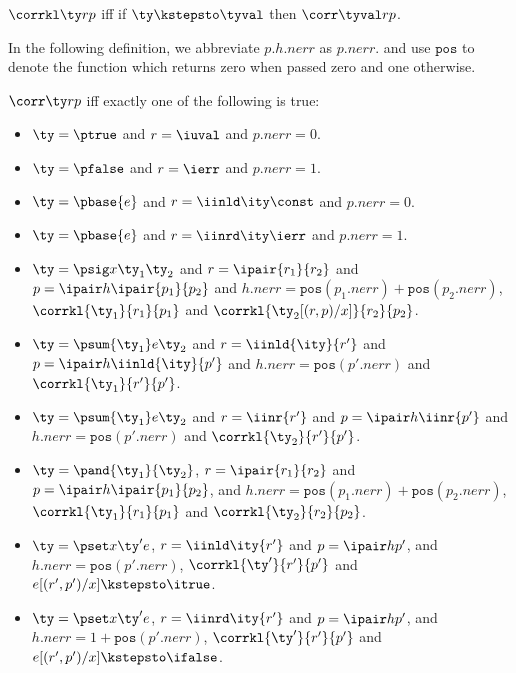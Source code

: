 \begin{definition}
$\corrkl \ty r p$ iff if $\ty \kstepsto \tyval$ then $\corr \tyval r p$.
\end{definition}

In the following definition, we abbreviate $p.h.{nerr}$ as $p.{nerr}$.
and use $\mathtt{pos}$ to denote the function which returns zero when
passed zero and one otherwise.


\begin{definition}
$\corr \ty r p$ iff exactly one of the following is true:
  \begin{itemize}
  \item $\ty = \ptrue$ and $r = \iuval$ and $p.{nerr} = 0$.
  \item $\ty = \pfalse$ and $r = \ierr$ and $p.{nerr} = 1$.
  \item $\ty = \pbase{e}$ and $r = \iinld \ity \const$ and $p.{nerr} = 0$.
  \item $\ty = \pbase{e}$ and $r = \iinrd \ity \ierr$ and $p.{nerr} = 1$.
  \item $\ty = \psig x {\ty_1} {\ty_2}$ and $r =\ipair {r_1} {r_2}$ and $p =
    \ipair h {\ipair {p_1} {p_2}}$ 
    and $h.{nerr} = \mathtt{pos}(p_1.{nerr}) + \mathtt{pos}(p_2.{nerr})$, $\corrkl
    {\ty_1} {r_1} {p_1}$ and $\corrkl {\ty_2[(r,p)/x]} {r_2} {p_2}$.
  \item $\ty = \psum {\ty_1} e {\ty_2}$ and $r =\iinld {\ity}{r'}$
    and $p = \ipair h {\iinld {\ity}{p'}}$
    and $h.{nerr} = \mathtt{pos}(p'.{nerr})$ and $\corrkl
    {\ty_1} {r'} {p'}$.
  \item $\ty = \psum {\ty_1} e {\ty_2}$ and $r =\iinr {r'}$
    and $p = \ipair h {\iinr {p'}}$
    and $h.{nerr} = \mathtt{pos}(p'.{nerr})$ and $\corrkl
    {\ty_2} {r'} {p'}$.
  \item $\ty = \pand {\ty_1} {\ty_2}$, $r = \ipair {r_1} {r_2}$ and $p =
    \ipair h {\ipair {p_1}{p_2}}$, 
    and $h.{nerr} = \mathtt{pos}(p_1.{nerr}) + \mathtt{pos}(p_2.{nerr})$, 
    $\corrkl {\ty_1} {r_1} {p_1}$ and $\corrkl {\ty_2} {r_2} {p_2}$.
  \item $\ty = \pset x {\ty'} e$, $r = \iinld \ity {r'}$ and $p =
    \ipair h {p'}$, 
    and $h.{nerr} = \mathtt{pos}(p'.{nerr})$, $\corrkl {\ty'}{r'}{p'}$
    and $e[(r',p')/x] \kstepsto\itrue$.
  \item $\ty = \pset x {\ty'} e$, $r = \iinrd \ity {r'}$
    and $p = \ipair h {p'}$,
    and $h.{nerr} = 1 + \mathtt{pos}(p'.{nerr})$,
    $\corrkl {\ty'}{r'}{p'}$ and $e[(r',p')/x] \kstepsto \ifalse$.

\end{itemize}
\end{definition}
